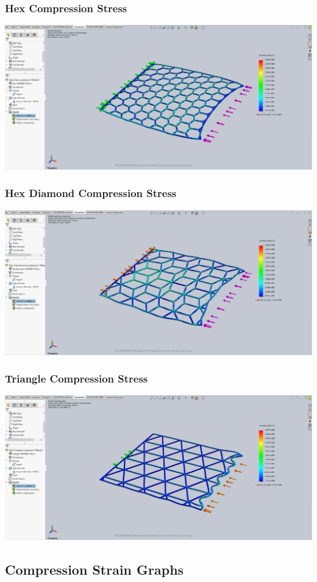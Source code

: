 \documentclass[12pt, letterpaper]{article}
\begin{document}
\begin{singlespace}
\subsubsection{Hex Compression Stress}
\label{ap:h-c-vm}
\includegraphics[width=0.8\linewidth]{./graphs/compression/hex-compression-stress}

\subsubsection{Hex Diamond Compression Stress}
\label{ap:hd-c-vm}
\includegraphics[width=0.8\linewidth]{./graphs/compression/hex-diamond-compression-stress}

\subsubsection{Triangle Compression Stress}
\label{ap:t-c-vm}
\includegraphics[width=0.8\linewidth]{./graphs/compression/triangle-compression-stress}


\subsection{Compression Strain Graphs}
\label{ap:c-es}


\end{singlespace}
\end{document}

